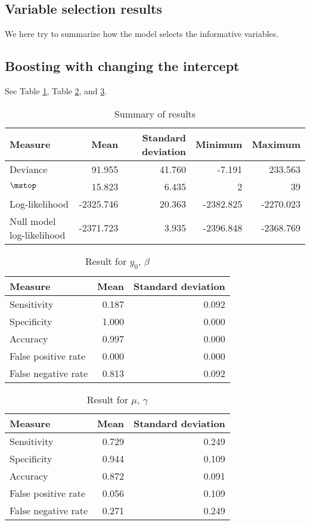 \subsection{Variable selection results}
We here try to summarize how the model selects the informative variables.

\subsection{Boosting with changing the intercept}
See Table \ref{table:non-correlated-with-intercept-summary}, Table \ref{table:non-correlated-with-intercept-y0}, and \ref{table:non-correlated-with-intercept-mu}.
\begin{table}\caption{Summary of results}\label{table:non-correlated-with-intercept-summary}
\begin{tabular}{l|rrrr}
Measure &   Mean & Standard deviation &  Minimum &    Maximum \\
\hline
Deviance    &    91.955 & 41.760 &    -7.191 &   233.563 \\
$\mstop$      &    15.823 &  6.435 &     2 &    39 \\
Log-likelihood      & -2325.746 & 20.363 & -2382.825 & -2270.023 \\
Null model log-likelihood & -2371.723 &  3.935 & -2396.848 & -2368.769
\end{tabular}
\end{table}

\begin{table}\caption{Result for $y_0$, $\beta$}\label{table:non-correlated-with-intercept-y0}
\begin{tabular}{l|rr}
Measure &  Mean &    Standard deviation \\
\hline
Sensitivity & 0.187 & 0.092 \\
Specificity & 1.000 & 0.000 \\
Accuracy    & 0.997 & 0.000 \\
False positive rate         & 0.000 & 0.000 \\
False negative rate         & 0.813 & 0.092
\end{tabular}
\end{table}


\begin{table}\caption{Result for $\mu$, $\gamma$}\label{table:non-correlated-with-intercept-mu}
\begin{tabular}{l|rr}
Measure     & Mean   & Standard deviation     \\
\hline
Sensitivity & 0.729 & 0.249 \\
Specificity & 0.944 & 0.109 \\
Accuracy    & 0.872 & 0.091 \\
False positive rate         & 0.056 & 0.109 \\
False negative rate         & 0.271 & 0.249
\end{tabular}
\end{table}



